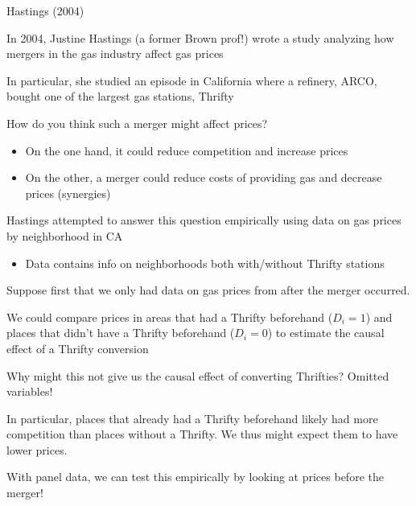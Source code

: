 \documentclass[11pt,english,handout]{beamer}
\newenvironment{wideitemize}{\itemize\addtolength{\itemsep}{10pt}}{\enditemize}
\begin{document}
\begin{frame}{Hastings (2004)}
\begin{wideitemize}
	\item
	In 2004, Justine Hastings (a former Brown prof!) wrote a study analyzing how mergers in the gas industry affect gas prices 
	
	\pause
	\item
	In particular, she studied an episode in California where a refinery, ARCO, bought one of the largest gas stations, Thrifty
	
	\pause
	\item
	How do you think such a merger might affect prices? 
	\pause
		\begin{itemize}
			\item 
			On the one hand, it could reduce competition and increase prices
			\item
			On the other, a merger could reduce costs of providing gas and decrease prices (synergies)
		\end{itemize}

	
	\pause
	\item
	Hastings attempted to answer this question empirically using data on gas prices by neighborhood in CA 
		\begin{itemize}
			\item
			Data contains info on neighborhoods both with/without Thrifty stations 
		\end{itemize}	
	 
\end{wideitemize}
	
\end{frame}
	
	
\begin{frame}
	\begin{wideitemize}
		\item 
		Suppose first that we only had data on gas prices from after the merger occurred.
		
		\item
		We could compare prices in areas that had a Thrifty beforehand ($D_i = 1$) and places that didn't have a Thrifty beforehand ($D_i=0$) to estimate the causal effect of a Thrifty conversion
		
		\pause
		\item
		Why might this not give us the causal effect of converting Thrifties? \pause Omitted variables!
		
		\pause
		\item
		In particular, places that already had a Thrifty beforehand likely had more competition than places without a Thrifty. We thus might expect them to have lower prices.
		
		\pause
		\item
		With panel data, we can test this empirically by looking at prices before the merger!
	\end{wideitemize}
\end{frame}	
\end{document}
